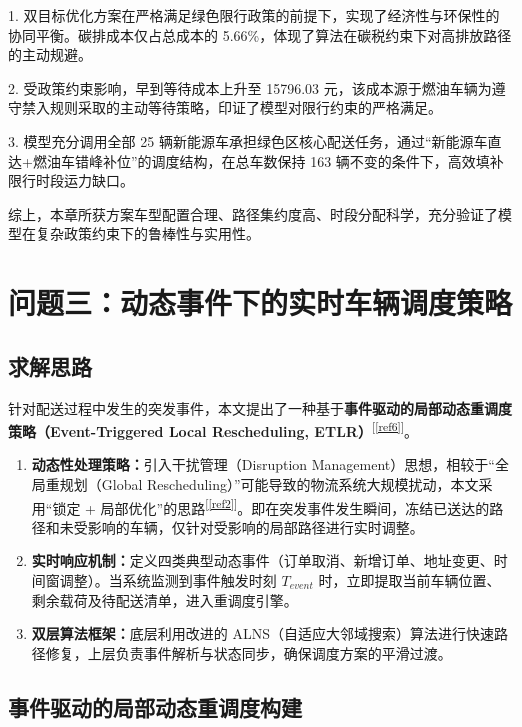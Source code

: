 \documentclass[12pt,a4paper]{article}
\begin{document}
 1. 双目标优化方案在严格满足绿色限行政策的前提下，实现了经济性与环保性的协同平衡。碳排成本仅占总成本的 5.66\%，体现了算法在碳税约束下对高排放路径的主动规避。

 2. 受政策约束影响，早到等待成本上升至 15796.03 元，该成本源于燃油车辆为遵守禁入规则采取的主动等待策略，印证了模型对限行约束的严格满足。
 
 3. 模型充分调用全部 25 辆新能源车承担绿色区核心配送任务，通过“新能源车直达+燃油车错峰补位”的调度结构，在总车数保持 163 辆不变的条件下，高效填补限行时段运力缺口。
 
 综上，本章所获方案车型配置合理、路径集约度高、时段分配科学，充分验证了模型在复杂政策约束下的鲁棒性与实用性。





\section{问题三：动态事件下的实时车辆调度策略}

\subsection{求解思路}
针对配送过程中发生的突发事件，本文提出了一种基于\textbf{事件驱动的局部动态重调度策略（Event-Triggered Local Rescheduling, ETLR）}\textsuperscript{[\ref{ref6}]}。
\begin{enumerate}
    \item \textbf{动态性处理策略：}引入干扰管理（Disruption Management）思想，相较于“全局重规划（Global Rescheduling）”可能导致的物流系统大规模扰动，本文采用“锁定 + 局部优化”的思路\textsuperscript{[\ref{ref2}]}。即在突发事件发生瞬间，冻结已送达的路径和未受影响的车辆，仅针对受影响的局部路径进行实时调整。
    \item \textbf{实时响应机制：}定义四类典型动态事件（订单取消、新增订单、地址变更、时间窗调整）。当系统监测到事件触发时刻 $T_{event}$ 时，立即提取当前车辆位置、剩余载荷及待配送清单，进入重调度引擎。
    \item \textbf{双层算法框架：}底层利用改进的 ALNS（自适应大邻域搜索）算法进行快速路径修复，上层负责事件解析与状态同步，确保调度方案的平滑过渡。
\end{enumerate}




\subsection{事件驱动的局部动态重调度构建}
\end{document}
